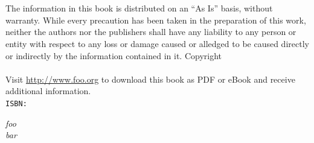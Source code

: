 \thispagestyle{empty}
\booktitle
\newpage
\newpage
\begin{titlepage}
\begin{flushright}
\bookauthors{} \\
\vspace{10em}
{\Huge\bfseries\sffamily\booktitle}\\
\vspace{2em}
{\large\sffamily\booksubtitle}
\end{flushright}
\end{titlepage}
\thispagestyle{empty}
The information in this book is distributed on an ``As Is'' basis, without warranty. While every precaution has been taken in the preparation of this work, neither the authors nor the publishers shall have any liability to any person or entity with respect to any loss or damage caused or alledged to be caused directly or indirectly by the information contained in it.%
\vfill
Copyright \textcopyright{} \bookyear{} \bookauthors\\
\newline
{}
\newline \\
Visit \url{http://www.foo.org} to download this book as PDF or eBook and receive additional information.
\newline \\
{\tt ISBN: \bookisbn}%
\newpage
\thispagestyle{empty}
\vspace*{2cm}
\begin{flushright}
{\Large\itshape foo\\bar}\\
\end{flushright}
\newpage
\thispagestyle{empty}
\mbox{}
\newpage
